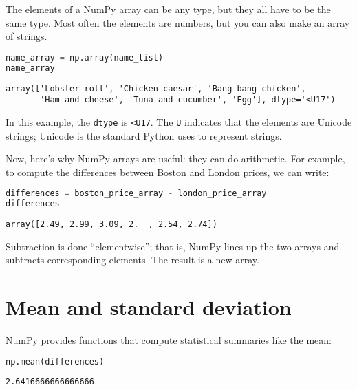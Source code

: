 The elements of a NumPy array can be any type, but they all have to be
the same type. Most often the elements are numbers, but you can also
make an array of strings.

\begin{lstlisting}[language=Python]
name_array = np.array(name_list)
name_array
\end{lstlisting}

\begin{lstlisting}[]
array(['Lobster roll', 'Chicken caesar', 'Bang bang chicken',
       'Ham and cheese', 'Tuna and cucumber', 'Egg'], dtype='<U17')
\end{lstlisting}

In this example, the \passthrough{\lstinline!dtype!} is
\passthrough{\lstinline!<U17!}. The \passthrough{\lstinline!U!}
indicates that the elements are Unicode strings; Unicode is the standard
Python uses to represent strings.

Now, here's why NumPy arrays are useful: they can do arithmetic. For
example, to compute the differences between Boston and London prices, we
can write:

\begin{lstlisting}[language=Python]
differences = boston_price_array - london_price_array
differences
\end{lstlisting}

\begin{lstlisting}[]
array([2.49, 2.99, 3.09, 2.  , 2.54, 2.74])
\end{lstlisting}

Subtraction is done ``elementwise''; that is, NumPy lines up the two
arrays and subtracts corresponding elements. The result is a new array.

\hypertarget{mean-and-standard-deviation}{%
\section{Mean and standard
deviation}\label{mean-and-standard-deviation}}

NumPy provides functions that compute statistical summaries like the
mean:

\begin{lstlisting}[language=Python]
np.mean(differences)
\end{lstlisting}

\begin{lstlisting}[]
2.6416666666666666
\end{lstlisting}

